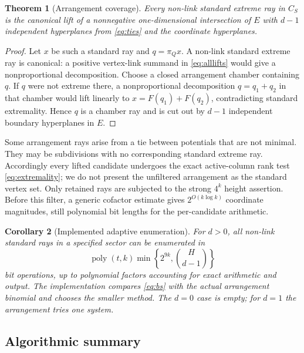 \documentclass[11pt]{article}
\newtheorem{theorem}{Theorem}[section]
\newtheorem{corollary}[theorem]{Corollary}
\theoremstyle{definition}
\theoremstyle{remark}
\newcommand{\poly}{\operatorname{poly}}
\begin{document}
\begin{theorem}[Arrangement coverage]
\label{thm:arrangement}
Every non-link standard extreme ray in $C_S$ is the canonical lift of a
nonnegative one-dimensional intersection of $E$ with $d-1$ independent
hyperplanes from \eqref{eq:ties} and the coordinate hyperplanes.
\end{theorem}
\begin{proof}
Let $x$ be such a standard ray and $q=\pi_Qx$. A non-link standard extreme
ray is canonical: a positive vertex-link summand in \eqref{eq:alllifts}
would give a nonproportional decomposition. Choose a closed arrangement
chamber containing $q$. If $q$ were not extreme there, a nonproportional
decomposition $q=q_1+q_2$ in that chamber would lift linearly to
$x=F(q_1)+F(q_2)$, contradicting standard extremality. Hence $q$ is a chamber
ray and is cut out by $d-1$ independent boundary hyperplanes in $E$.
\end{proof}

Some arrangement rays arise from a tie between potentials that are not
minimal. They may be subdivisions with no corresponding standard extreme
ray. Accordingly every lifted candidate undergoes the exact active-column
rank test \eqref{eq:extremality}; we do not present the unfiltered arrangement
as the standard vertex set. Only retained rays are subjected to the strong
$4^k$ height assertion. Before this filter, a generic cofactor estimate gives
$2^{O(k\log k)}$ coordinate magnitudes, still polynomial bit lengths for
the per-candidate arithmetic.

\begin{corollary}[Implemented adaptive enumeration]
\label{cor:adaptive}
For $d>0$, all non-link standard rays in a specified sector can be enumerated in
\begin{equation}
 \poly(t,k)\min\left\{2^{9k},\binom H{d-1}\right\}
 \label{eq:adaptive}
\end{equation}
bit operations, up to polynomial factors accounting for exact arithmetic
and output. The implementation compares \eqref{eq:bs} with the actual
arrangement binomial and chooses the smaller method. The $d=0$ case is empty;
for $d=1$ the arrangement tries one system.
\end{corollary}

\subsection{Algorithmic summary}
\end{document}
